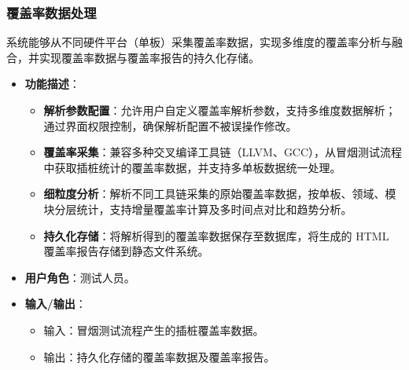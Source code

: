 \subsubsection{覆盖率数据处理}
    系统能够从不同硬件平台（单板）采集覆盖率数据，实现多维度的覆盖率分析与融合，并实现覆盖率数据与覆盖率报告的持久化存储。
    \begin{itemize}
        \item \textbf{功能描述}：
        \begin{itemize}
            \item \textbf{解析参数配置}：允许用户自定义覆盖率解析参数，支持多维度数据解析；通过界面权限控制，确保解析配置不被误操作修改。
            \item \textbf{覆盖率采集}：兼容多种交叉编译工具链（LLVM、GCC），从冒烟测试流程中获取插桩统计的覆盖率数据，并支持多单板数据统一处理。
            \item \textbf{细粒度分析}：解析不同工具链采集的原始覆盖率数据，按单板、领域、模块分层统计，支持增量覆盖率计算及多时间点对比和趋势分析。
            \item \textbf{持久化存储}：将解析得到的覆盖率数据保存至数据库，将生成的 HTML 覆盖率报告存储到静态文件系统。
        \end{itemize}
        \item \textbf{用户角色}：测试人员。
        \item \textbf{输入/输出}：
        \begin{itemize}
            \item 输入：冒烟测试流程产生的插桩覆盖率数据。
            \item 输出：持久化存储的覆盖率数据及覆盖率报告。
        \end{itemize}
    \end{itemize}



